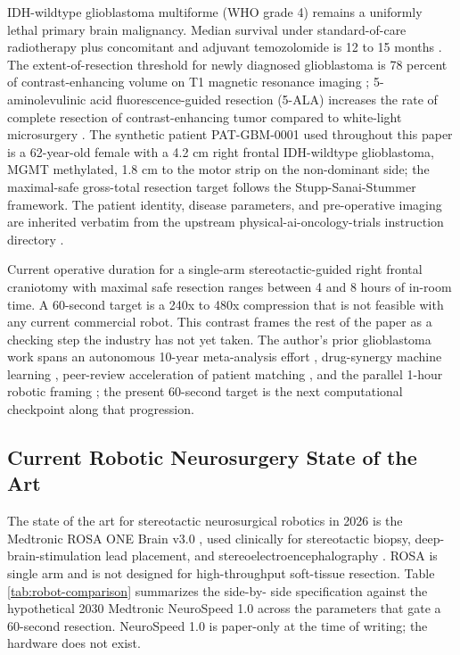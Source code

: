 IDH-wildtype glioblastoma multiforme (WHO grade 4) remains a uniformly
lethal primary brain malignancy. Median survival under standard-of-care
radiotherapy plus concomitant and adjuvant temozolomide is 12 to 15
months \cite{Stupp2005Glioblastoma}. The extent-of-resection threshold
for newly diagnosed glioblastoma is 78 percent of contrast-enhancing
volume on T1 magnetic resonance imaging \cite{Sanai2011GBMResection};
5-aminolevulinic acid fluorescence-guided resection (5-ALA) increases
the rate of complete resection of contrast-enhancing tumor compared
to white-light microsurgery \cite{Stummer20055ALA}. The synthetic
patient PAT-GBM-0001 used throughout this paper is a 62-year-old
female with a 4.2 cm right frontal IDH-wildtype glioblastoma, MGMT
methylated, 1.8 cm to the motor strip on the non-dominant side; the
maximal-safe gross-total resection target follows the
Stupp-Sanai-Stummer framework. The patient identity, disease
parameters, and pre-operative imaging are inherited verbatim from the
upstream physical-ai-oncology-trials instruction directory
\cite{one-minute-variant-instructions}.

Current operative duration for a single-arm stereotactic-guided right
frontal craniotomy with maximal safe resection ranges between 4 and
8 hours of in-room time. A 60-second target is a 240x to 480x
compression that is not feasible with any current commercial robot.
This contrast frames the rest of the paper as a checking step the
industry has not yet taken. The author's prior glioblastoma work
spans an autonomous 10-year meta-analysis effort
\cite{kawchak_2025_15549831}, drug-synergy machine learning
\cite{kawchak_2025_17614396}, peer-review acceleration of patient
matching \cite{kawchak_2025_17774560}, and the parallel 1-hour
robotic framing \cite{kawchak_2026_19994945}; the present 60-second
target is the next computational checkpoint along that progression.

\subsection{Current Robotic Neurosurgery State of the Art}
\label{sec:intro-baseline}

The state of the art for stereotactic neurosurgical robotics in 2026
is the Medtronic ROSA ONE Brain v3.0 \cite{rosa-one-brain}, used
clinically for stereotactic biopsy, deep-brain-stimulation lead
placement, and stereoelectroencephalography
\cite{Lefranc2014ROSAStereotaxy, Kalakoti2019RoboticsReview}. ROSA is
single arm and is not designed for high-throughput soft-tissue
resection. Table \ref{tab:robot-comparison} summarizes the side-by-
side specification against the hypothetical 2030 Medtronic NeuroSpeed
1.0 across the parameters that gate a 60-second resection. NeuroSpeed
1.0 is paper-only at the time of writing; the hardware does not exist.

